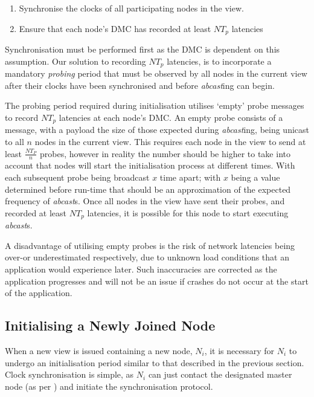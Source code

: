     \begin{enumerate}[label=\roman*]
        \item    Synchronise the clocks of all participating nodes in the view.
        
        \item    Ensure that each node's DMC has recorded at least $NT_p$ latencies
    \end{enumerate}         
     
     Synchronisation must be performed first as the DMC is dependent on this assumption.  Our solution to recording $NT_p$ latencies, is to incorporate a mandatory \emph{probing} period that must be observed by all nodes in the current view after their clocks have been synchronised and before \emph{abcast}ing can begin.  

    The probing period required during initialisation utilises \textquoteleft{}empty' probe messages to record $NT_p$ latencies at each node's DMC.  An empty probe consists of a message, with a payload the size of those expected during \emph{abcast}ing, being unicast to all $n$ nodes in the current view.  This requires each node in the view to send at least $\frac{NT_P}{n}$ probes, however in reality the number should be higher to take into account that nodes will start the initialisation process at different times.  With each subsequent probe being broadcast $x$ time apart; with $x$ being a value determined before run-time that should be an approximation of the expected frequency of \emph{abcast}s.  Once all nodes in the view have sent their probes, and recorded at least $NT_p$ latencies, it is possible for this node to start executing \emph{abcast}s.  
    
    A disadvantage of utilising empty probes is the risk of network latencies being over-or underestimated respectively, due to unknown load conditions that an application would experience later.  Such inaccuracies are corrected as the application progresses and will not be an issue if crashes do not occur at the start of the application.  

        
    \subsection{Initialising a Newly Joined Node}
    When a new view is issued containing a new node, $N_i$, it is necessary for $N_i$ to undergo an initialisation period similar to that described in the previous section.  Clock synchronisation is simple, as $N_i$ can just contact the designated master node (as per \citep{Cristian:1996:SA:227210.227231}) and initiate the synchronisation protocol.  
    
